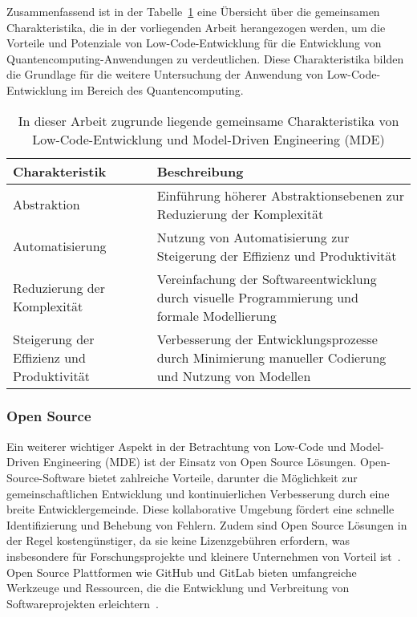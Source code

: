 Zusammenfassend ist in der Tabelle~\ref{tab:common_characteristics} eine Übersicht über die gemeinsamen Charakteristika, die 
in der vorliegenden Arbeit herangezogen werden, um die Vorteile und Potenziale von Low-Code-Entwicklung 
für die Entwicklung von Quantencomputing-Anwendungen zu verdeutlichen. Diese Charakteristika bilden die Grundlage für die 
weitere Untersuchung der Anwendung von Low-Code-Entwicklung im Bereich des Quantencomputing. 

\begin{table}[h!]
    \centering
    \begin{tabular}{|p{5cm}|p{9cm}|}
    \hline
    \textbf{Charakteristik} & \textbf{Beschreibung} \\
    \hline
    Abstraktion & Einführung höherer Abstraktionsebenen zur Reduzierung der Komplexität \\
    \hline
    Automatisierung & Nutzung von Automatisierung zur Steigerung der Effizienz und Produktivität \\
    \hline
    Reduzierung der Komplexität & Vereinfachung der Softwareentwicklung durch visuelle Programmierung und formale Modellierung \\
    \hline
    Steigerung der Effizienz und Produktivität & Verbesserung der Entwicklungsprozesse durch Minimierung manueller Codierung und Nutzung von Modellen \\
    \hline
    \end{tabular}
    \caption{In dieser Arbeit zugrunde liegende gemeinsame Charakteristika von Low-Code-Entwicklung und Model-Driven Engineering (MDE)}
    \label{tab:common_characteristics}
\end{table}


\subsubsection{Open Source}
Ein weiterer wichtiger Aspekt in der Betrachtung von Low-Code und Model-Driven Engineering (MDE) ist der 
Einsatz von Open Source Lösungen. Open-Source-Software bietet zahlreiche Vorteile, darunter die Möglichkeit 
zur gemeinschaftlichen Entwicklung und kontinuierlichen Verbesserung durch eine breite Entwicklergemeinde. 
Diese kollaborative Umgebung fördert eine schnelle Identifizierung und Behebung 
von Fehlern. Zudem sind Open Source Lösungen in der Regel kostengünstiger, da sie keine Lizenzgebühren 
erfordern, was insbesondere für Forschungsprojekte und kleinere Unternehmen von Vorteil 
ist~\cite{raymond2010cathedral}. Open Source Plattformen wie GitHub und GitLab bieten umfangreiche Werkzeuge und 
Ressourcen, die die Entwicklung und Verbreitung von Softwareprojekten erleichtern~\cite{fitzgerald2006transformation}.

